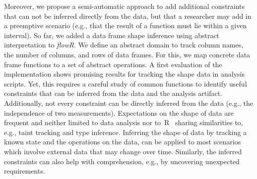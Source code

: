 Moreover, we propose a semi-automatic approach to add additional constraints that can not be inferred directly from the data, but that a researcher may add in a preemptive scenario (e.g., that the result of a function must lie within a given interval).
So far, we added a data frame shape inference using abstract interpretation to \textit{flowR}. We define an abstract domain to track column names, the number of columns, and rows of data frames. For this, we map concrete data frame functions to a set of abstract operations. A first evaluation of the implementation shows promising results for tracking the shape data in analysis scripts.
Yet, this requires a careful study of common functions to identify useful constraints that can be inferred from the data and the analysis artifact.
Additionally, not every constraint can be directly inferred from the data (e.g., the independence of two measurements). %
Expectations on the shape of data are frequent and neither limited to data analysis nor to~R~\cite{DBLP:conf/pldi/NegriniSU23,10.1145/3729391} sharing similarities to, e.g., taint tracking and type inference.
Inferring the shape of data by tracking a known state and the operations on the data, can be applied to most scenarios which involve external data that may change over time.
Similarly, the inferred constraints can also help with comprehension, e.g., by uncovering unexpected requirements.

